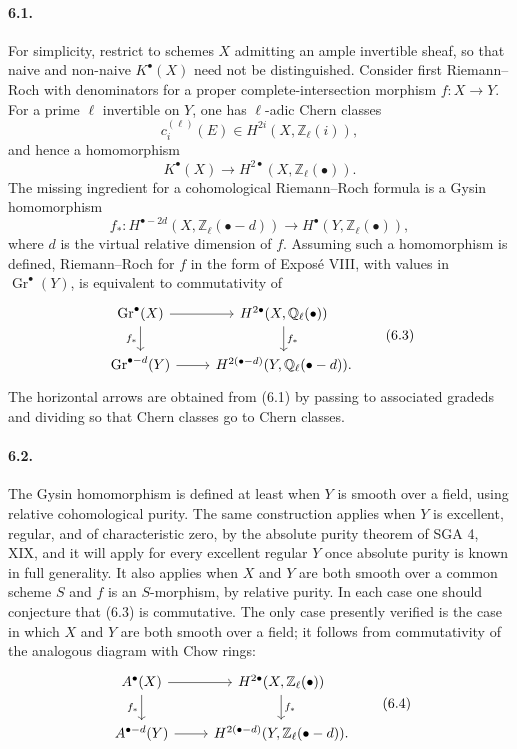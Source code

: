 \documentclass[12pt]{article}
\newcommand{\ZZ}{\mathbb Z}
\newcommand{\QQ}{\mathbb Q}
\newcommand{\Gr}{\operatorname{Gr}}
\newcommand{\longto}{\longrightarrow}
\begin{document}
\paragraph{6.1.}
For simplicity, restrict to schemes $X$ admitting an ample invertible sheaf, so that naive and non-naive $K^\bullet(X)$ need not be distinguished. Consider first Riemann--Roch with denominators for a proper complete-intersection morphism $f:X\to Y$. For a prime $\ell$ invertible on $Y$, one has $\ell$-adic Chern classes
\[
c_i^{(\ell)}(E)\in H^{2i}(X,\ZZ_\ell(i)),
\]
and hence a homomorphism
\[
K^\bullet(X)\longto H^{2\bullet}(X,\ZZ_\ell(\bullet)).
\tag{6.1}
\]
The missing ingredient for a cohomological Riemann--Roch formula is a Gysin homomorphism
\[
f_*:H^{\bullet-2d}(X,\ZZ_\ell(\bullet-d))
\longto H^\bullet(Y,\ZZ_\ell(\bullet)),
\tag{6.2}
\]
where $d$ is the virtual relative dimension of $f$. Assuming such a homomorphism is defined, Riemann--Roch for $f$ in the form of Exposé VIII, with values in $\Gr^\bullet(Y)$, is equivalent to commutativity of
\[
\begin{tikzcd}
\Gr^\bullet(X)\arrow[r]\arrow[d,"f_*"']&
H^{2\bullet}(X,\QQ_\ell(\bullet))\arrow[d,"f_*"]\\
\Gr^{\bullet-d}(Y)\arrow[r]&
H^{2(\bullet-d)}(Y,\QQ_\ell(\bullet-d)).
\end{tikzcd}
\tag{6.3}
\]
The horizontal arrows are obtained from (6.1) by passing to associated gradeds and dividing so that Chern classes go to Chern classes.

\paragraph{6.2.}
The Gysin homomorphism is defined at least when $Y$ is smooth over a field, using relative cohomological purity. The same construction applies when $Y$ is excellent, regular, and of characteristic zero, by the absolute purity theorem of SGA 4, XIX, and it will apply for every excellent regular $Y$ once absolute purity is known in full generality. It also applies when $X$ and $Y$ are both smooth over a common scheme $S$ and $f$ is an $S$-morphism, by relative purity. In each case one should conjecture that (6.3) is commutative. The only case presently verified is the case in which $X$ and $Y$ are both smooth over a field; it follows from commutativity of the analogous diagram with Chow rings:
\[
\begin{tikzcd}
A^\bullet(X)\arrow[r]\arrow[d,"f_*"']&
H^{2\bullet}(X,\ZZ_\ell(\bullet))\arrow[d,"f_*"]\\
A^{\bullet-d}(Y)\arrow[r]&
H^{2(\bullet-d)}(Y,\ZZ_\ell(\bullet-d)).
\end{tikzcd}
\tag{6.4}
\]
\end{document}
